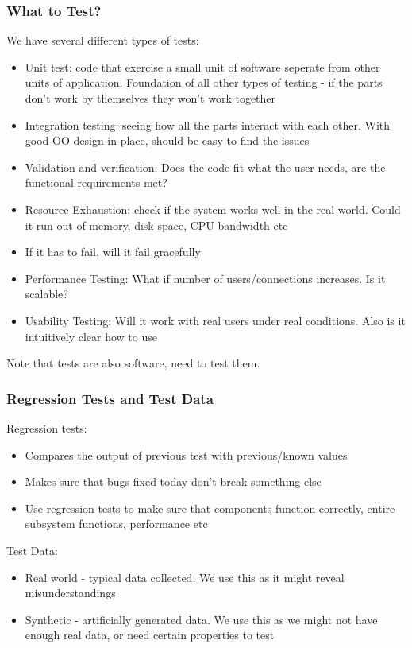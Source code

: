 \documentclass{article}
\begin{document}
\subsubsection{What to Test?}
We have several different types of tests:
\begin{itemize}
    \item Unit test: code that exercise a small unit of software seperate from other units of application. Foundation of all other types of testing - if the parts don't work by themselves they won't work together
    \item Integration testing: seeing how all the parts interact with each other. With good OO design in place, should be easy to find the issues
    \item Validation and verification: Does the code fit what the user needs, are the functional requirements met?
    \item Resource Exhaustion: check if the system works well in the real-world. Could it run out of memory, disk space, CPU bandwidth etc
    \item If it has to fail, will it fail gracefully
    \item Performance Testing: What if number of users/connections increases. Is it scalable?
    \item Usability Testing: Will it work with real users under real conditions. Also is it intuitively clear how to use
\end{itemize}
Note that tests are also software, need to test them.
\subsubsection{Regression Tests and Test Data}
Regression tests:
\begin{itemize}
    \item Compares the output of previous test with previous/known values
    \item Makes sure that bugs fixed today don't break something else
    \item Use regression tests to make sure that components function correctly, entire subsystem functions, performance etc
\end{itemize}
Test Data:
\begin{itemize}
    \item Real world - typical data collected. We use this as it might reveal misunderstandings
    \item Synthetic - artificially generated data. We use this as we might not have enough real data, or need certain properties to test
\end{itemize}
\end{document}
